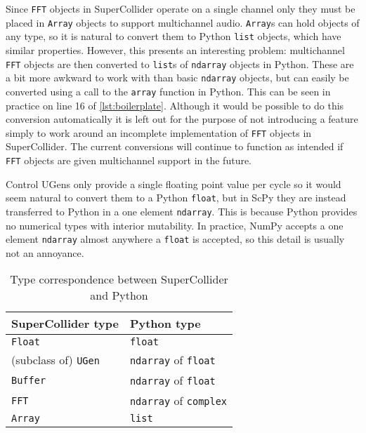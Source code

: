 \documentclass{article}
\begin{document}
Since \texttt{FFT} objects in SuperCollider operate on a single channel only they must be placed
in \texttt{Array} objects to support multichannel audio. \texttt{Array}s can hold objects of any
type, so it is natural to convert them to Python \texttt{list} objects, which have similar
properties. However, this presents an interesting problem: multichannel \texttt{FFT} objects are
then converted to \texttt{list}s of \texttt{ndarray} objects in Python. These are a bit more
awkward to work with than basic \texttt{ndarray} objects, but can easily be converted using a call
to the \texttt{array} function in Python. This can be seen in practice on line 16 of
\autoref{lst:boilerplate}. Although it would be possible to do this conversion
automatically it is left out for the purpose of not introducing a feature simply to work around an
incomplete implementation of \texttt{FFT} objects in SuperCollider. The current conversions will
continue to function as intended if \texttt{FFT} objects are given multichannel support in the
future.

Control UGens only provide a single floating point value per cycle so it would seem natural to
convert them to a Python \texttt{float}, but in ScPy they are instead transferred to Python in a
one element \texttt{ndarray}. This is because Python provides no numerical types with interior
mutability. In practice, NumPy accepts a one element \texttt{ndarray} almost anywhere a
\texttt{float} is accepted, so this detail is usually not an annoyance.

\begin{table}[ht]
    \caption{Type correspondence between SuperCollider and Python}
    \begin{center}
        \begin{tabular}{ll}
            \toprule
            SuperCollider type & Python type \\
            \midrule
            \texttt{Float} & \texttt{float} \\
            (subclass of) \texttt{UGen} & \texttt{ndarray} of \texttt{float} \\
            \texttt{Buffer} & \texttt{ndarray} of \texttt{float} \\
            \texttt{FFT} & \texttt{ndarray} of \texttt{complex} \\
            \texttt{Array} & \texttt{list} \\
            \bottomrule
        \end{tabular}
    \end{center}
\end{table}
\end{document}
